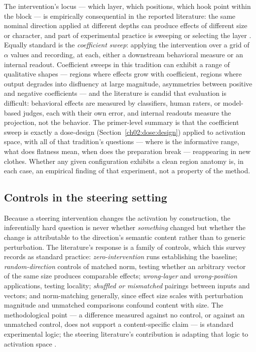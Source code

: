The intervention's locus --- which layer, which positions, which hook point within the block --- is empirically consequential in the reported literature: the same nominal direction applied at different depths can produce effects of different size or character, and part of experimental practice is sweeping or selecting the layer \cite{zourepe}. Equally standard is the \emph{coefficient sweep}: applying the intervention over a grid of $\alpha$ values and recording, at each, either a downstream behavioral measure or an internal readout. Coefficient sweeps in this tradition can exhibit a range of qualitative shapes --- regions where effects grow with coefficient, regions where output degrades into disfluency at large magnitude, asymmetries between positive and negative coefficients --- and the literature is candid that evaluation is difficult: behavioral effects are measured by classifiers, human raters, or model-based judges, each with their own error, and internal readouts measure the projection, not the behavior. The primer-level summary is that the coefficient sweep is exactly a dose-design (Section~\ref{ch02:dose:design}) applied to activation space, with all of that tradition's questions --- where is the informative range, what does flatness mean, when does the preparation break --- reappearing in new clothes. Whether any given configuration exhibits a clean region anatomy is, in each case, an empirical finding of that experiment, not a property of the method.

\subsection{Controls in the steering setting}\label{ch02:steering:controls}

Because a steering intervention changes the activation by construction, the inferentially hard question is never whether \emph{something} changed but whether the change is attributable to the direction's semantic content rather than to generic perturbation. The literature's response is a family of controls, which this survey records as standard practice: \emph{zero-intervention} runs establishing the baseline; \emph{random-direction} controls of matched norm, testing whether an arbitrary vector of the same size produces comparable effects; \emph{wrong-layer} and \emph{wrong-position} applications, testing locality; \emph{shuffled or mismatched} pairings between inputs and vectors; and norm-matching generally, since effect size scales with perturbation magnitude and unmatched comparisons confound content with size. The methodological point --- a difference measured against no control, or against an unmatched control, does not support a content-specific claim --- is standard experimental logic; the steering literature's contribution is adapting that logic to activation space \cite{zourepe}.

